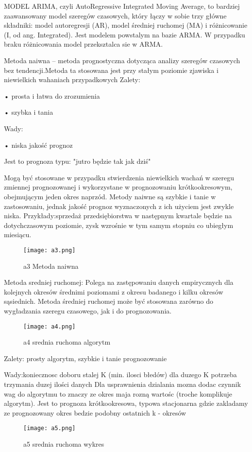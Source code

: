 MODEL ARIMA, czyli AutoRegressive Integrated Moving Average, to bardziej zaawansowany model szeregów czasowych, który łączy w sobie trzy główne składniki: model autoregresji (AR), model średniej ruchomej (MA) i różnicowanie (I, od ang. Integrated).  Jest modelem powstalym na bazie ARMA. W przypadku braku różnicowania model przeksztalca sie w ARMA.\cite{Musz2012}\cite{Farz2020}


 Metoda naiwna – metoda prognostyczna dotycząca analizy szeregów czasowych bez tendencji.Metoda ta stosowana jest przy stałym poziomie zjawiska i niewielkich wahaniach przypadkowych
Zalety: 

    • prosta i łatwa do zrozumienia 
    
    • szybka i tania

Wady:

    • niska jakość prognoz 
    
    Jest to prognoza typu: "jutro będzie tak jak dziś"
 \cite{naiw2023}\cite{Shekh2018} 

Mogą być stosowane w przypadku stwierdzenia niewielkich wachań w szeregu zmiennej prognozowanej i wykorzystane w prognozowaniu krótkookresowym, obejmującym jeden okres naprzód. 
Metody naiwne są szybkie i tanie w zastosowaniu, jednak jakość prognoz wyznaczonych z ich użyciem jest zwykle niska.
Przykłady:sprzedaż przedsiębiorstwa w następnym  kwartale będzie na dotychczasowym poziomie,
zysk wzrośnie w tym samym stopniu co ubiegłym miesiącu.\cite{szer2009}

\begin{figure}[h!]
    \label{fig:a3}
    \centering \texttt{[image: a3.png]}
    \caption{a3 Metoda naiwna\cite{szer2009}}
\end{figure}

Metoda sredniej ruchomej:  Polega na zastępowaniu danych empirycznych dla kolejnych okresów średnimi poziomami z okresu badanego i kilku okresów sąsiednich. Metoda średniej ruchomej może być stosowana zarówno do wygładzania szeregu czasowego, jak i do prognozowania.
\begin{figure}[h!]
    \label{fig:a4}
    \centering \texttt{[image: a4.png]}
    \caption{a4 srednia ruchoma algorytm\cite{szer2009}}
\end{figure}

Zalety: prosty algorytm, szybkie i tanie prognozowanie

Wady:koniecznosc doboru stalej K (min. ilosci błedów) dla duzego K potrzeba trzymania duzej ilości danych
Dla usprawnienia dzialania mozna dodac czynnik wag do algorytmu to znaczy ze okres maja rozną wartośc (troche komplikuje algorytm).
Jest to prognoza krótkookresowa, typowa stacjonarna  gdzie zakladamy ze prognozowany okres bedzie podobny ostatnich k - okresów\cite{szer2009}
\begin{figure}[h!]
    \label{fig:a5}
    \centering \texttt{[image: a5.png]}
    \caption{a5 srednia ruchoma wykres\cite{szer2009}}
\end{figure}



